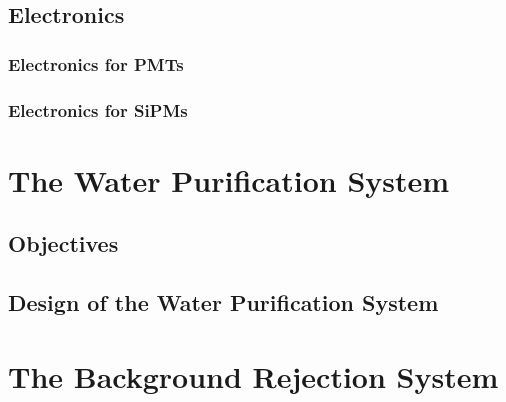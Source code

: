 \documentclass[12pt,a4paper]{book}
\begin{document}
		\subsection{Electronics}\label{subsec:IntroductionElectronicalSystem}
			
	
			\subsubsection[Electronic for PMTs]{Electronics for PMTs}\label{subsubsec:PMTsElectronicalSystem}
			
			
			\subsubsection[Electronics for SiPMs]{Electronics for SiPMs}\label{subsubsec:SiPMsElectronicalSystem}
			
		
	\section{The Water Purification System}\label{sec:UltraPureWaterSystem}
		
		\subsection{Objectives}\label{subsec:IntroductionWaterSystem}
		 
					
		\subsection{Design of the Water Purification System}\label{subsec:SetUpWaterSystem}
		
	
	\section{The Background Rejection System}\label{sec:IntroductionBackground}
	 
	
\end{document}
